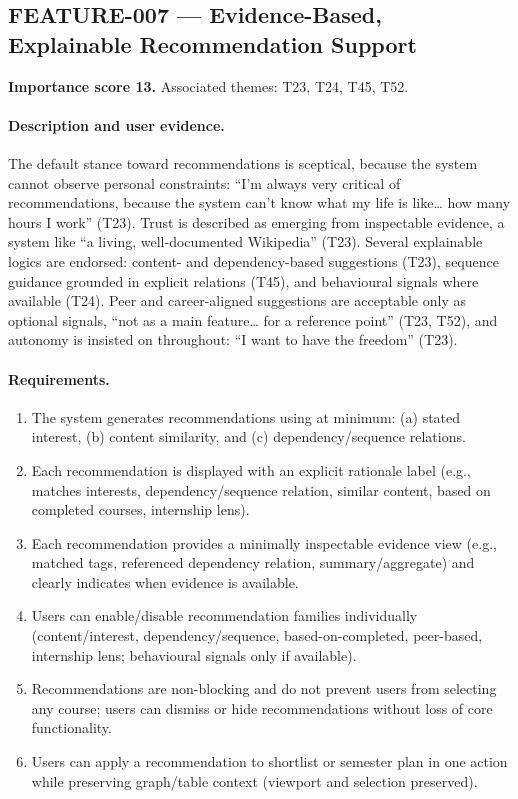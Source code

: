 \subsection{FEATURE-007 --- Evidence-Based, Explainable Recommendation Support}
\label{feat:007}
\textbf{Importance score 13.} Associated themes: T23, T24, T45, T52.

\paragraph{Description and user evidence.}
The default stance toward recommendations is sceptical, because the system cannot observe personal constraints: \enquote{I'm always very critical of recommendations, because the system can't know what my life is like… how many hours I work} (T23). Trust is described as emerging from inspectable evidence, a system like \enquote{a living, well-documented Wikipedia} (T23). Several explainable logics are endorsed: content- and dependency-based suggestions (T23), sequence guidance grounded in explicit relations (T45), and behavioural signals where available (T24). Peer and career-aligned suggestions are acceptable only as optional signals, \enquote{not as a main feature… for a reference point} (T23, T52), and autonomy is insisted on throughout: \enquote{I want to have the freedom} (T23).

\paragraph{Requirements.}
\begin{enumerate}
    \item The system generates recommendations using at minimum: (a) stated interest, (b) content similarity, and (c) dependency/sequence relations.
    \item Each recommendation is displayed with an explicit rationale label (e.g., matches interests, dependency/sequence relation, similar content, based on completed courses, internship lens).
    \item Each recommendation provides a minimally inspectable evidence view (e.g., matched tags, referenced dependency relation, summary/aggregate) and clearly indicates when evidence is available.
    \item Users can enable/disable recommendation families individually (content/interest, dependency/sequence, based-on-completed, peer-based, internship lens; behavioural signals only if available).
    \item Recommendations are non-blocking and do not prevent users from selecting any course; users can dismiss or hide recommendations without loss of core functionality.
    \item Users can apply a recommendation to shortlist or semester plan in one action while preserving graph/table context (viewport and selection preserved).
\end{enumerate}

